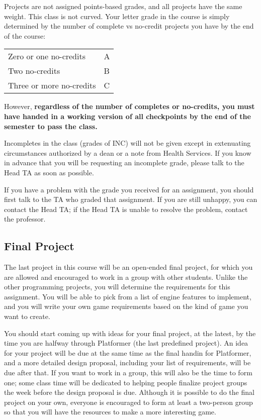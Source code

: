 \documentclass{cs1972}
\begin{document}
 Projects are not assigned points-based grades, and all projects have the same weight. This class is not curved. Your letter grade in the course is simply determined by the number of complete vs no-credit projects you have by the end of the course:
 
 \begin{table*}[htbp]
  \centering
  \begin{tabular}{l l}
    Zero or one no-credits & A \\
    Two no-credits & B \\
    Three or more no-credits & C \\
  \end{tabular}
 \end{table*}

 However, \textbf{regardless of the number of completes or no-credits, you must have handed in a working version of all checkpoints by the end of the semester to pass the class.}
 
 Incompletes in the class (grades of INC) will not be given except in extenuating circumstances authorized by a dean or a note from Health Services. If you know in advance that you will be requesting an incomplete grade, please talk to the Head TA as soon as possible.
 
 If you have a problem with the grade you received for an assignment, you should first talk to the TA who graded that assignment. If you are still unhappy, you can contact the Head TA; if the Head TA is unable to resolve the problem, contact the professor.

 \subsection*{Final Project}
 The last project in this course will be an open-ended final project, for which you are allowed and encouraged to work in a group with other students. Unlike the other programming projects, you will determine the requirements for this assignment. You will be able to pick from a list of engine features to implement, and you will write your own game requirements based on the kind of game you want to create.
 
 You should start coming up with ideas for your final project, at the latest, by the time you are halfway through Platformer (the last predefined project). An idea for your project will be due at the same time as the final handin for Platformer, and a more detailed design proposal, including your list of requirements, will be due after that. If you want to work in a group, this will also be the time to form one; some class time will be dedicated to helping people finalize project groups the week before the design proposal is due. Although it is possible to do the final project on your own, everyone is encouraged to form at least a two-person group so that you will have the resources to make a more interesting game.
\end{document}
